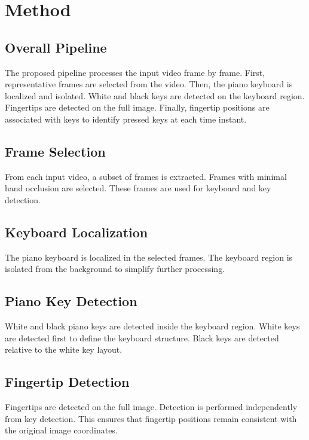 \section{Method}

\subsection{Overall Pipeline}

The proposed pipeline processes the input video frame by frame.
First, representative frames are selected from the video.
Then, the piano keyboard is localized and isolated.
White and black keys are detected on the keyboard region.
Fingertips are detected on the full image.
Finally, fingertip positions are associated with keys
to identify pressed keys at each time instant.

\subsection{Frame Selection}

From each input video, a subset of frames is extracted.
Frames with minimal hand occlusion are selected.
These frames are used for keyboard and key detection.

\subsection{Keyboard Localization}

The piano keyboard is localized in the selected frames.
The keyboard region is isolated from the background
to simplify further processing.

\subsection{Piano Key Detection}

White and black piano keys are detected inside the keyboard region.
White keys are detected first to define the keyboard structure.
Black keys are detected relative to the white key layout.

\subsection{Fingertip Detection}

Fingertips are detected on the full image.
Detection is performed independently from key detection.
This ensures that fingertip positions remain consistent
with the original image coordinates.

